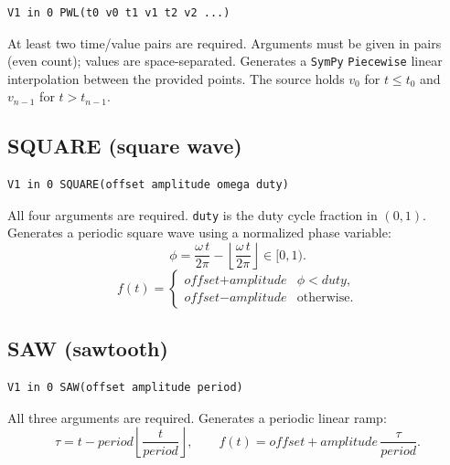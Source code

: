\documentclass[11pt,a4paper]{article}
\newcommand{\code}[1]{\texttt{#1}}
\newcommand{\sympy}{\texttt{SymPy}}
\begin{document}
\begin{lstlisting}[language=spice]
V1 in 0 PWL(t0 v0 t1 v1 t2 v2 ...)
\end{lstlisting}

At least two time/value pairs are required.
Arguments must be given in pairs (even count); values are space-separated.
Generates a \sympy{} \code{Piecewise} linear interpolation between the provided
points. The source holds \(v_0\) for \(t \leq t_0\) and \(v_{n-1}\) for
\(t > t_{n-1}\).

\subsection{SQUARE (square wave)}

\begin{lstlisting}[language=spice]
V1 in 0 SQUARE(offset amplitude omega duty)
\end{lstlisting}

All four arguments are required.
\code{duty} is the duty cycle fraction in \((0, 1)\).
Generates a periodic square wave using a normalized phase variable:
\begin{equation}
    \phi = \frac{\omega\,t}{2\pi}
           - \left\lfloor\frac{\omega\,t}{2\pi}\right\rfloor \in [0,1).
\end{equation}
\begin{equation}
    f(t) = \begin{cases}
        \textit{offset} + \textit{amplitude} & \phi < \textit{duty}, \\
        \textit{offset} - \textit{amplitude} & \text{otherwise.}
    \end{cases}
\end{equation}

\subsection{SAW (sawtooth)}

\begin{lstlisting}[language=spice]
V1 in 0 SAW(offset amplitude period)
\end{lstlisting}

All three arguments are required.
Generates a periodic linear ramp:
\begin{equation}
    \tau = t - \textit{period}\left\lfloor\frac{t}{\textit{period}}\right\rfloor,
    \qquad
    f(t) = \textit{offset} + \textit{amplitude}\,\frac{\tau}{\textit{period}}.
\end{equation}
\end{document}
